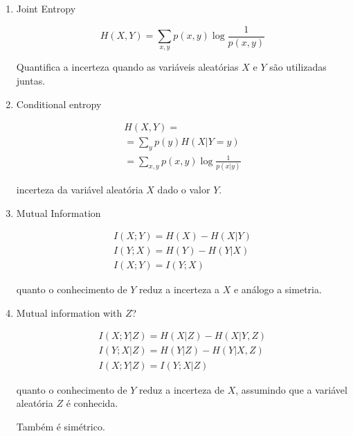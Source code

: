 \begin{enumerate}
    \item
    Joint Entropy
    
    \[H(X,Y) = \sum\limits_{x,y} {p(x,y)\log \frac{1}{p(x,y)}} \]
    
    Quantifica a incerteza quando as variáveis aleatórias $X$ e $Y$ são utilizadas juntas.
    
    \bigskip
    
    \item
    Conditional entropy
    
    \[\begin{array}{l}
    \displaystyle H(X,Y) = \\
    \displaystyle = \sum\limits_y {p(y)H(X|Y = y)} \\
    \displaystyle = \sum\limits_{x,y} {p(x,y)\log \frac{1}{{p(x|y)}}} 
    \end{array}\]
    
    incerteza da variável aleatória $X$ dado o valor $Y$.
    
    \bigskip
    
    \item
    Mutual Information
    
    \[\begin{array}{l}
    I(X;Y) = H(X) - H(X|Y)\\
    I(Y;X) = H(Y) - H(Y|X)\\
    I(X;Y) = I(Y;X)
    \end{array}\]
    
    quanto o conhecimento de $Y$ reduz a incerteza a $X$ e análogo a simetria.
    
    \bigskip
    
    \item
    Mutual information with $Z$?
    
    \[\begin{array}{l}
    I(X; Y | Z) = H(X | Z) - H(X | Y, Z)\\
    I(Y; X | Z) = H(Y | Z) - H(Y | X, Z)\\
    I(X; Y | Z) = I(Y; X | Z)
    \end{array}\]
    
    quanto o conhecimento de $Y$ reduz a incerteza de $X$, assumindo que a variável aleatória $Z$ é conhecida.
    
    Também é simétrico.
    
\end{enumerate}